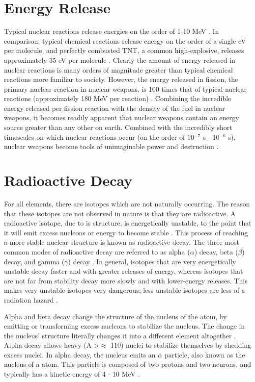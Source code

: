 \documentclass{report}
\begin{document}
\section{Energy Release}

Typical nuclear reactions release energies on the order of 1-10 MeV \cite{Prussin2014}. In comparison, typical chemical reactions release energy on the order of a single eV per molecule, and perfectly combusted TNT, a common high-explosive, releases approximately 35 eV per molecule \cite{Prussin2014}. Clearly the amount of energy released in nuclear reactions is many orders of magnitude greater than typical chemical reactions more familiar to society. However, the energy released in fission, the primary nuclear reaction in nuclear weapons, is 100 times that of typical nuclear reactions (approximately 180 MeV per reaction) \cite{krane1987introductory,Loveland2005}. Combining the incredible energy released per fission reaction with the density of the fuel in nuclear weapons, it becomes readily apparent that nuclear weapons contain an energy source greater than any other on earth. Combined  with the incredibly short timescales on which nuclear reactions occur (on the order of 10\(^{-7}\) s - 10\(^{-6}\) s),  nuclear weapons become tools of unimaginable power and destruction \cite{Loveland2005,Cochran1994,Prussin2015}.  


\section{Radioactive Decay}

For all elements, there are isotopes which are not naturally occurring. The reason that these isotopes are not observed in nature is that they are radioactive. A radioactive isotope, due to is structure, is energetically unstable, to the point that it will emit excess nucleons or energy to become stable \cite{Loveland2005}. This process of reaching a more stable nuclear structure is known as radioactive decay. The three most common modes of radioactive decay are referred to as alpha (\(\alpha\)) decay, beta (\(\beta\)) decay, and gamma (\(\gamma\)) decay \cite{Loveland2005}. In general, isotopes that are very energetically unstable decay faster and with greater releases of energy, whereas isotopes that are not far from stability decay more slowly and with lower-energy releases. This makes very unstable isotopes very dangerous; less unstable isotopes are less of a radiation hazard \cite{krane1987introductory}.

Alpha and beta decay change the structure of the nucleus of the atom, by emitting or transforming excess nucleons to stabilize the nucleus. The change in the nucleus' structure literally changes it into a different element altogether \cite{krane1987introductory}. Alpha decay allows heavy (A \textgreater \(\approx\) 110) nuclei to stabilize themselves by shedding excess nuclei. In alpha decay, the nucleus emits an \(\alpha\) particle, also known as the nucleus of a  atom. This particle is composed of two protons and two neurons, and typically has a kinetic energy of 4 - 10 MeV \cite{krane1987introductory}. 
\end{document}

